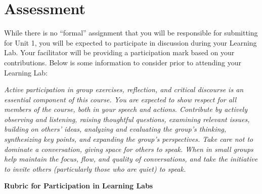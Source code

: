 \documentclass[
]{book}
\begin{document}
\hypertarget{assessment}{%
\section*{Assessment}\label{assessment}}

\begin{assessment}
While there is no ``formal'' assignment that you will be responsible for submitting for Unit 1, you will be expected to participate in discussion during your Learning Lab. Your facilitator will be providing a participation mark based on your contributions. Below is some information to consider prior to attending your Learning Lab:

\emph{Active participation in group exercises, reflection, and critical discourse is an essential component of this course. You are expected to show respect for all members of the course, both in your speech and actions. Contribute by actively observing and listening, raising thoughtful questions, examining relevant issues, building on others' ideas, analyzing and evaluating the group's thinking, synthesizing key points, and expanding the group's perspectives. Take care not to dominate a conversation, giving space for others to speak. When in small groups help maintain the focus, flow, and quality of conversations, and take the initiative to invite others (particularly those who are quiet) to speak.}

\textbf{Rubric for Participation in Learning Labs}


\end{assessment}
\end{document}
